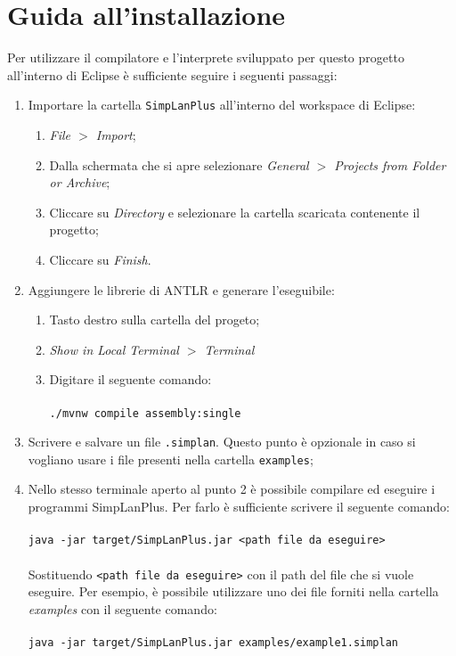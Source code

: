\documentclass[../report.tex]{subfiles}
\begin{document}
\chapter{Guida all'installazione}\label{a:intstallazione}
Per utilizzare il compilatore e l'interprete sviluppato per questo progetto all'interno di Eclipse \`e sufficiente seguire i seguenti passaggi:
\begin{enumerate}
    \item Importare la cartella \verb|SimpLanPlus| all'interno del workspace di Eclipse:
        \begin{enumerate}
            \item \textit{File $>$ Import};
            \item Dalla schermata che si apre selezionare \textit{General $>$ Projects from Folder or Archive};
            \item Cliccare su \textit{Directory} e selezionare la cartella scaricata contenente il progetto;
            \item Cliccare su \textit{Finish}.
        \end{enumerate}
    \item Aggiungere le librerie di ANTLR e generare l'eseguibile:
            \begin{enumerate}
                \item Tasto destro sulla cartella del progeto;
                \item \textit{Show in Local Terminal $>$ Terminal}
                \item Digitare il seguente comando:\\\\
                    \verb|./mvnw compile assembly:single|
            \end{enumerate}
    \item Scrivere e salvare un file \verb|.simplan|. Questo punto \`e opzionale in caso si vogliano usare i file presenti nella cartella \verb|examples|;
    \item Nello stesso terminale aperto al punto 2 \`e possibile compilare ed eseguire i programmi SimpLanPlus. Per farlo \`e sufficiente scrivere il seguente comando:\\\\
        \verb|java -jar target/SimpLanPlus.jar <path file da eseguire>|\\\\
        Sostituendo \verb|<path file da eseguire>| con il path del file che si vuole eseguire. Per esempio, \`e possibile utilizzare uno dei file forniti nella cartella \textit{examples} con il seguente comando:\\\\
        \verb|java -jar target/SimpLanPlus.jar examples/example1.simplan|
\end{enumerate}
\end{document}
